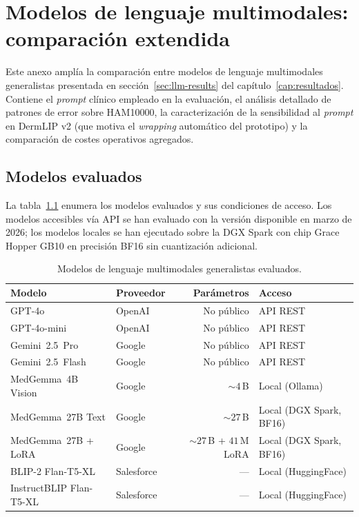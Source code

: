 
\chapter{Modelos de lenguaje multimodales: comparación extendida}
\label{cap:anexog}

Este anexo amplía la comparación entre modelos de lenguaje
multimodales generalistas presentada en secci\'on~\ref{sec:llm-results} del
capítulo~\ref{cap:resultados}. Contiene el \emph{prompt} clínico
empleado en la evaluación, el análisis detallado de patrones de
error sobre HAM10000, la caracterización de la sensibilidad al
\emph{prompt} en DermLIP v2 (que motiva el \emph{wrapping}
automático del prototipo) y la comparación de costes operativos
agregados.

\section{Modelos evaluados}
\label{sec:anexoh-modelos}

La tabla~\ref{tab:anexoh-modelos} enumera los modelos evaluados y
sus condiciones de acceso. Los modelos accesibles vía API se han
evaluado con la versión disponible en marzo de 2026; los modelos
locales se han ejecutado sobre la DGX Spark con chip Grace Hopper
GB10 en precisión BF16 sin cuantización adicional.

\begin{table}[H]
\centering
\footnotesize
\setlength{\tabcolsep}{4pt}
\renewcommand{\arraystretch}{0.95}
\caption{Modelos de lenguaje multimodales generalistas evaluados.}
\label{tab:anexoh-modelos}
\begin{tabular}{llrl}
\hline
Modelo                     & Proveedor   & Parámetros & Acceso \\
\hline
GPT-4o                     & OpenAI      & No público  & API REST \\
GPT-4o-mini                & OpenAI      & No público  & API REST \\
Gemini~2.5~Pro             & Google      & No público  & API REST \\
Gemini~2.5~Flash           & Google      & No público  & API REST \\
MedGemma~4B Vision         & Google      & $\sim 4$\,B & Local (Ollama) \\
MedGemma~27B Text          & Google      & $\sim 27$\,B & Local (DGX Spark, BF16) \\
MedGemma~27B + LoRA        & Google      & $\sim 27$\,B + $41$\,M LoRA & Local (DGX Spark, BF16) \\
BLIP-2 Flan-T5-XL          & Salesforce  & ---         & Local (HuggingFace) \\
InstructBLIP Flan-T5-XL    & Salesforce  & ---         & Local (HuggingFace) \\
\hline
\end{tabular}
\end{table}

